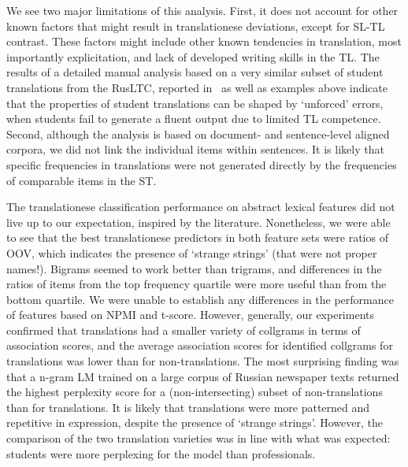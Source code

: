 We see two major limitations of this analysis. First, it does not account for other known factors that might result in translationese deviations, except for SL-TL contrast. These factors might include other known tendencies in translation, most importantly explicitation, and lack of developed writing skills in the TL. The results of a detailed manual analysis based on a very similar subset of student translations from the RusLTC, reported in~\cite{Kunilovskaya2022err} as well as examples above indicate that the properties of student translations can be shaped by `unforced' errors, when students fail to generate a fluent output due to limited TL competence.  
Second, although the analysis is based on document- and sentence-level aligned corpora, we did not link the individual items within sentences. It is likely that specific frequencies in translations were not generated directly by the frequencies of comparable items in the ST.

The translationese classification performance on abstract lexical features did not live up to our expectation, inspired by the literature. Nonetheless, we were able to see that the best translationese predictors in both feature sets were ratios of OOV, which indicates the presence of `strange strings' (that were not proper names!). Bigrams seemed to work better than trigrams, and differences in the ratios of items from the top frequency quartile were more useful than from the bottom quartile. We were unable to establish any differences in the performance of features based on NPMI and t-score. However, generally, our experiments confirmed that translations had a smaller variety of collgrams in terms of association scores, and the average association scores for identified collgrams for translations was lower than for non-translations.
The most surprising finding was that a n-gram LM trained on a large corpus of Russian newspaper texts returned the highest perplexity score for a (non-intersecting) subset of non-translations than for translations. It is likely that translations were more patterned and repetitive in expression, despite the presence of `strange strings'. However, the comparison of the two translation varieties was in line with what was expected: students were more perplexing for the model than professionals. 
